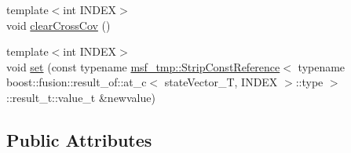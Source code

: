 \begin{DoxyCompactItemize}
{\footnotesize template$<$int I\-N\-D\-E\-X$>$ }\\void \hyperlink{structmsf__core_1_1GenericState__T_af549612e16331a261cec92ac5661a092}{clear\-Cross\-Cov} ()
\item 
{\footnotesize template$<$int I\-N\-D\-E\-X$>$ }\\void \hyperlink{structmsf__core_1_1GenericState__T_a4d1ee0b277d6ef5c297b412d98f03efc}{set} (const typename \hyperlink{structmsf__tmp_1_1StripConstReference}{msf\-\_\-tmp\-::\-Strip\-Const\-Reference}$<$ typename boost\-::fusion\-::result\-\_\-of\-::at\-\_\-c$<$ state\-Vector\-\_\-\-T, I\-N\-D\-E\-X $>$\-::type $>$\-::result\-\_\-t\-::value\-\_\-t \&newvalue)
\end{DoxyCompactItemize}
\subsection*{Public Attributes}
